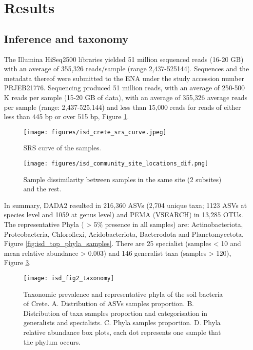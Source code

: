\section{Results}\label{results}

\subsection{Inference and taxonomy}\label{inference_taxonomy}

The Illumina HiSeq2500 libraries yielded 51 million sequenced reads (16-20 GB) with
an average of 355,326 reads/sample (range 2,437-525144). Sequences and the
metadata thereof were submitted to the ENA under the study accession number PRJEB21776.
Sequencing produced 51 million reads, with an average of 250-500 K reads per
sample (15-20 GB of data), with an average of 355,326 average reads per sample
(range: 2,437-525,144) and less than 15,000 reads for reads of either less than
445 bp or over 515 bp, Figure \ref{fig:isd_srs-curve_samples}.
   
   \begin{figure}[h]
      \centering
      \texttt{[image: figures/isd\_crete\_srs\_curve.jpeg]}
      \caption[SRS curve]{SRS curve of the samples. }
      \label{fig:isd_srs-curve_samples}
   \end{figure}

\begin{figure}[h] 
    \centering\texttt{[image: figures/isd\_community\_site\_locations\_dif.png]}
\caption{Sample dissimilarity between samples in the same site (2 subsites) and the rest.}
    \label{fig:isd_site_locations}
\end{figure}

In summary, DADA2 resulted in 216,360 ASVs (2,704 unique
taxa; 1123 ASVs at species level and 1059 at genus level) and
PEMA (VSEARCH) in 13,285 OTUs.
The representative Phyla ( > 5\% presence in all samples) are:
Actinobacteriota, Proteobacteria, Chloroflexi, Acidobacteriota,
Bacterodota and Planctomycetota, Figure \ref{fig:isd_top_phyla_samples}.
There are 25 specialist (samples < 10 and mean relative
abundance > 0.003) and 146 generalist taxa (samples > 120), Figure \ref{fig:isd_fig2_taxonomy}.

\begin{figure}[h] 
    \centering\texttt{[image: isd\_fig2\_taxonomy]}
    \caption{Taxonomic prevalence and representative phyla of the soil bacteria of Crete. 
    A. Distribution of ASVs samples proportion. B. Distribution of taxa samples
proportion and categorisation in generalists and specialists. C. Phyla samples proportion.
D. Phyla relative abundance box plots, each dot represents one sample that the phylum occurs.}
    \label{fig:isd_fig2_taxonomy}
\end{figure}

